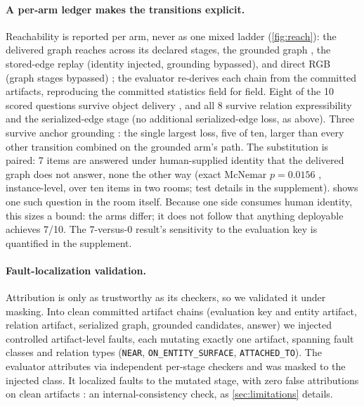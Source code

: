 \paragraph{A per-arm ledger makes the transitions explicit.}
Reachability is reported per arm, never as one mixed ladder (\cref{fig:reach}): the
delivered graph reaches \SRArmDeliveredLadder{} across its declared stages, the grounded
graph \SRArmGroundedLadder{}, the stored-edge replay \SRArmStoredLadder{} (identity
injected, grounding bypassed), and direct RGB \SRArmDirectLadder{} (graph stages
bypassed)
; the evaluator re-derives each chain from the committed artifacts, reproducing
the committed statistics field for field. Eight of the 10 scored questions survive object
delivery , and all 8 survive relation expressibility and the serialized-edge
stage  (no additional serialized-edge loss, as above). Three survive anchor grounding
: the single largest loss, five of ten, larger than every other transition
combined on the grounded arm's path. The substitution is paired: 7 items are answered under human-supplied identity
that the delivered graph does not answer, none the other way (exact McNemar $p = 0.0156$
, instance-level, over ten items in two rooms; test details in the supplement).
 shows one such question in the room itself. Because one side
consumes human identity, this sizes a bound: the arms differ; it does not follow that
anything deployable achieves 7/10. The 7-versus-0 result's sensitivity to the
evaluation key is quantified in the supplement.

\paragraph{Fault-localization validation.}
Attribution is only as trustworthy as its checkers, so we validated it under masking.
Into clean committed artifact chains (evaluation key and entity artifact, relation
artifact, serialized graph, grounded candidates, answer) we injected controlled
artifact-level faults, each mutating exactly one artifact, spanning \SRFaultClasses{}
fault classes and \SRFaultRelationTypes{} relation types (\texttt{NEAR},
\texttt{ON\_ENTITY\_SURFACE}, \texttt{ATTACHED\_TO}). The evaluator attributes via
independent per-stage checkers and was masked to the injected class. It localized
\SRFaultLocalized{} faults to the mutated stage, with zero false attributions on clean
artifacts : an internal-consistency check, as \cref{sec:limitations}
details.

